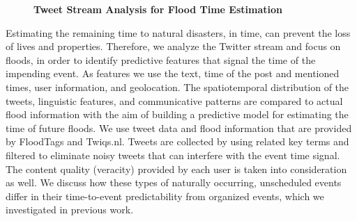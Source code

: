 \documentclass[10pt, a4paper, twopage, headinclude, footinclude, BCOR5mm]{book}
\begin{document}
\newpage

\begin{figure}[t!]
\centering
\large\textbf{Tweet Stream Analysis for Flood Time Estimation}
\vspace*{0.5cm}
\end{figure}


\begin{table}[t!]
\end{table} 
\begin{table}[t!]
\end{table} 
\noindent
Estimating the remaining time to natural disasters, in time, can prevent the loss of lives and properties. Therefore, we analyze the Twitter stream and focus on floods, in order to identify predictive features that signal the time of the impending event. As features we use the text, time of the post and mentioned times, user information, and geolocation. The spatiotemporal distribution of the tweets, linguistic features, and communicative patterns are compared to actual flood information with the aim of building a predictive model for estimating the time of future floods. We use tweet data and flood information that are provided by FloodTags and Twiqs.nl. Tweets are collected by using related key terms and filtered to eliminate noisy tweets that can interfere with the event time signal. The content quality (veracity) provided by each user is taken into consideration as well. We discuss how these types of naturally occurring, unscheduled events differ in their time-to-event predictability from organized events, which we investigated in previous work.  
\end{document}

